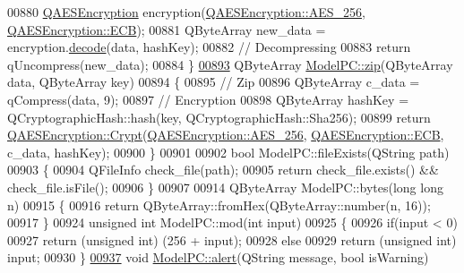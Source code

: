 \begin{DoxyCode}
{00880     \hyperlink{class_q_a_e_s_encryption}{QAESEncryption} encryption(\hyperlink{class_q_a_e_s_encryption_abe48208f4f6c7d68e6a10b49b9d0b7bdacde97774ab1d4c609e04b0dd13a1e1f7}{QAESEncryption::AES\_256}, 
      \hyperlink{class_q_a_e_s_encryption_ad3e031c49a3d56566379d75b40b7b255a4ca7f51778e2adf1f464164a0ba8e75e}{QAESEncryption::ECB});
00881     QByteArray new\_data = encryption.\hyperlink{class_q_a_e_s_encryption_a58f972f2b66c2454edd5112495463bba}{decode}(data, hashKey);
00882     \textcolor{comment}{// Decompressing}
00883     \textcolor{keywordflow}{return} qUncompress(new\_data);
00884 \}
\hypertarget{modelpc_8cpp_source_l00893}{}\hyperlink{class_model_p_c_afebbbfa4b07deba4f68fc6dfb50f353f}{00893} QByteArray \hyperlink{class_model_p_c_afebbbfa4b07deba4f68fc6dfb50f353f}{ModelPC::zip}(QByteArray data, QByteArray key)
00894 \{
00895     \textcolor{comment}{// Zip}
00896     QByteArray c\_data = qCompress(data, 9);
00897     \textcolor{comment}{// Encryption}
00898     QByteArray hashKey = QCryptographicHash::hash(key, QCryptographicHash::Sha256);
00899     \textcolor{keywordflow}{return} \hyperlink{class_q_a_e_s_encryption_a43819eeb6a7cb29fbd3cb6ad640dcbdf}{QAESEncryption::Crypt}(\hyperlink{class_q_a_e_s_encryption_abe48208f4f6c7d68e6a10b49b9d0b7bdacde97774ab1d4c609e04b0dd13a1e1f7}{QAESEncryption::AES\_256}, 
      \hyperlink{class_q_a_e_s_encryption_ad3e031c49a3d56566379d75b40b7b255a4ca7f51778e2adf1f464164a0ba8e75e}{QAESEncryption::ECB}, c\_data, hashKey);
00900 \}
00901 
00902 \textcolor{keywordtype}{bool} ModelPC::fileExists(QString path)
00903 \{
00904     QFileInfo check\_file(path);
00905     \textcolor{keywordflow}{return} check\_file.exists() && check\_file.isFile();
00906 \}
00907 
00914 QByteArray ModelPC::bytes(\textcolor{keywordtype}{long} \textcolor{keywordtype}{long} n)
00915 \{
00916     \textcolor{keywordflow}{return} QByteArray::fromHex(QByteArray::number(n, 16));
00917 \}
00924 \textcolor{keywordtype}{unsigned} \textcolor{keywordtype}{int} ModelPC::mod(\textcolor{keywordtype}{int} input)
00925 \{
00926     \textcolor{keywordflow}{if}(input < 0)
00927         \textcolor{keywordflow}{return} (\textcolor{keywordtype}{unsigned} \textcolor{keywordtype}{int}) (256 + input);
00928     \textcolor{keywordflow}{else}
00929         \textcolor{keywordflow}{return} (\textcolor{keywordtype}{unsigned} \textcolor{keywordtype}{int}) input;
00930 \}
\hypertarget{modelpc_8cpp_source_l00937}{}\hyperlink{class_model_p_c_a9079a101d83672aa48fd2dbac797de40}{00937} \textcolor{keywordtype}{void} \hyperlink{class_model_p_c_a9079a101d83672aa48fd2dbac797de40}{ModelPC::alert}(QString message, \textcolor{keywordtype}{bool} isWarning)
}
\end{DoxyCode}
